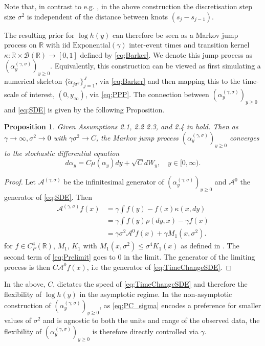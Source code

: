 \documentclass[ba,preprint]{imsart}
\theoremstyle{plain}
\newtheorem{proposition}{Proposition}[section]
\theoremstyle{definition}
\theoremstyle{remark}
\begin{document}
 Note that, in contrast to e.g. \citet{Roberts2010}, in the above construction the discretisation step size $\sigma^2$ is independent of the distance between knots $(s_j - s_{j-1})$. {\color{red}The resulting prior for $\log h(y)$ can therefore be seen as a Markov jump process on $\mathbb{R}$ with iid $\text{Exponential}(\gamma)$ inter-event times and transition kernel $\kappa:\mathbb{R}\times \mathcal{B}(\mathbb{R}) \to [0,1]$ defined by \eqref{eq;Barker}. We denote this jump process as $(\alpha_y^{(\gamma, \sigma)})_{y\geq 0}$. Equivalently, this construction can be viewed as first simulating a numerical skeleton $\{\check{\alpha}_{j\sigma^2}\}_{j=1}^J$, via \eqref{eq;Barker} and then mapping this to the time-scale of interest, $(0,y_\infty)$, via \eqref{eq;PPP}. The connection between $(\alpha_y^{(\gamma, \sigma)})_{y\geq 0}$ and \eqref{eq;SDE} is given by the following Proposition. 
 
 \begin{proposition}
    \label{prop;Limit}
    Given Assumptions 2.1, 2.2 2.3, and 2.4 in \cite{Livingstone2024} hold. Then as $\gamma \to \infty, \sigma^2 \to 0$ with $\gamma\sigma^2 \to C$, the Markov jump process $(\alpha_y^{(\gamma, \sigma)})_{y\geq 0}$ converges to the stochastic differential equation
    \begin{equation}
        \label{eq;TimeChangeSDE}
        d\alpha_y = C\mu(\alpha_y)dy + \sqrt{C}dW_y,\quad y \in [0,\infty).
    \end{equation}
 \end{proposition}
 \begin{proof}
     Let $\mathcal{A}^{(\gamma,\sigma)}$ be the infinitesimal generator of $(\alpha_y^{(\gamma, \sigma)})_{y\geq 0}$ and $\mathcal{A}^0$ the generator of \eqref{eq;SDE}. Then 
     \begin{align}
        \nonumber
        \mathcal{A}^{(\gamma,\sigma)}f(x) &= \gamma\int f(y) - f(x)\kappa(x,dy) \\
        \nonumber
        &= \gamma\int f(y)\rho(dy,x) - \gamma f(x)\\
        \label{eq;Prelimit}
        & = \gamma\sigma^2\mathcal{A}^0f(x) + \gamma M_1(x,\sigma^2).
    \end{align} 
    for $f \in C^4_P(\mathbb{R})$, $M_1$, $K_1$ with $M_1(x,\sigma^2) \leq \sigma^4K_1(x)$ as defined in \citet{Livingstone2024}. The second term of \eqref{eq;Prelimit} goes to 0 in the limit. The generator of the limiting process is then $C\mathcal{A}^0f(x)$, i.e the generator of \eqref{eq;TimeChangeSDE}.
 \end{proof}
In the above, $C$, dictates the speed of \eqref{eq;TimeChangeSDE} and therefore the flexibility of $\log h(y)$ in the asymptotic regime. In the non-asymptotic construction of $(\alpha^{(\gamma,\sigma)}_y)_{y\geq 0}$, as \eqref{eq;PC_sigma} encodes a preference for smaller values of $\sigma^2$ and is agnostic to both the units and range of the observed data, the flexibility of $(\alpha^{(\gamma,\sigma)}_y)_{y\geq 0}$ is therefore directly controlled via $\gamma$. 

}
\end{document}
